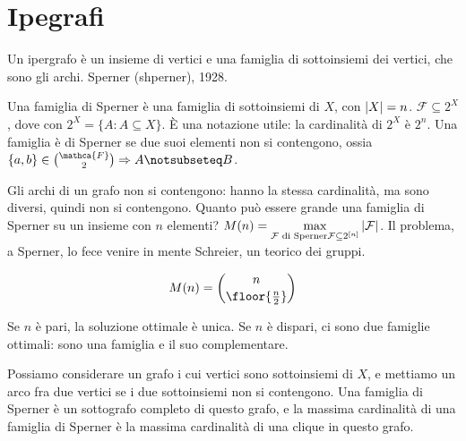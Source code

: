 \section{Ipegrafi}

Un ipergrafo \`e un insieme di vertici e una famiglia di sottoinsiemi dei vertici, che sono gli archi.
Sperner (shperner), 1928.

Una famiglia di Sperner \`e una famiglia di sottoinsiemi di $X$, con $\left\lvert{X}\right\rvert = n$.
$\mathcal{F} \subseteq 2^X$, dove con $2^X = \{ A : A \subseteq X \}$.
\`E una notazione utile: la cardinalit\`a di $2^X$ \`e $2^n$.
Una famiglia \`e di Sperner se due suoi elementi non si contengono, ossia $\{a,b\} \in \binom{\mathca{F}}{2} \implies A \notsubseteq B$.

Gli archi di un grafo non si contengono: hanno la stessa cardinalit\`a, ma sono diversi, quindi non si contengono.
Quanto pu\`o essere grande una famiglia di Sperner su un insieme con $n$ elementi?
$M(n) = \max\limits_{\mathcal{F} \text{ di Sperner} \\ \mathcal{F} \subseteq 2^{[n]}} \left\lvert{\mathcal{F}}\right\rvert$.
Il problema, a Sperner, lo fece venire in mente Schreier, un teorico dei gruppi.

\begin{theorem}[di Sperner (1928)]
	\[
		M(n) = \binom{n}{\floor{\frac{n}{2}}}
	\]

	Se $n$ \`e pari, la soluzione ottimale \`e unica.
	Se $n$ \`e dispari, ci sono due famiglie ottimali: sono una famiglia e il suo complementare.
\end{theorem}

Possiamo considerare un grafo i cui vertici sono sottoinsiemi di $X$, e mettiamo un arco fra due vertici se i due sottoinsiemi non si contengono.
Una famiglia di Sperner \`e un sottografo completo di questo grafo, e la massima cardinalit\`a di una famiglia di Sperner \`e la massima cardinalit\`a di una clique in questo grafo.

